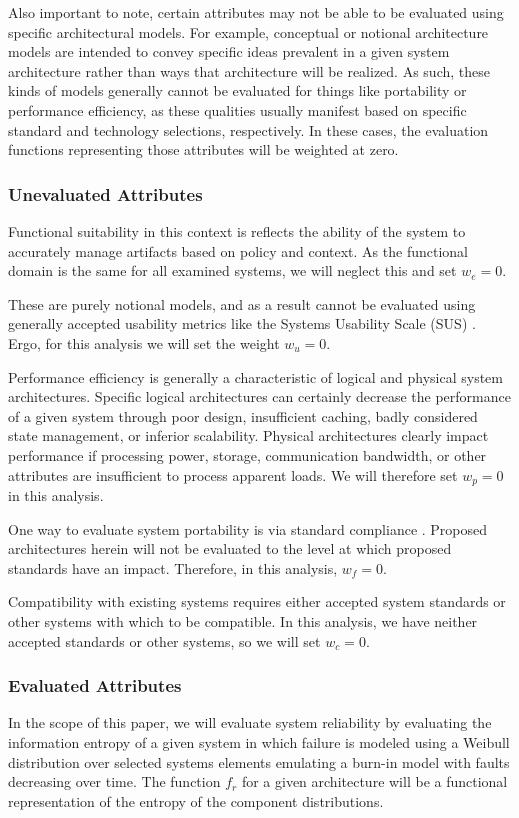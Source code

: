 Also important to note, certain attributes may not be able to be evaluated using specific architectural models.  For example, conceptual or notional architecture models are intended to convey specific ideas prevalent in a given system architecture rather than ways that architecture will be realized.  As such, these kinds of models generally cannot be evaluated for things like portability or performance efficiency, as these qualities usually manifest based on specific standard and technology selections, respectively.  In these cases, the evaluation functions representing those attributes will be weighted at zero.

\subsubsection*{Unevaluated Attributes}
Functional suitability in this context is reflects the ability of the system to accurately manage artifacts based on policy and context.  As the functional domain is the same for all examined systems, we will neglect this and set $ w_{e} = 0 $.

These are purely notional models, and as a result cannot be evaluated using generally accepted usability metrics like the Systems Usability Scale (SUS) \cite{proposal:sus}.  Ergo, for this analysis we will set the weight $w_{u} = 0$.

Performance efficiency is generally a characteristic of logical and physical system architectures.  Specific logical architectures can certainly decrease the performance of a given system through poor design, insufficient caching, badly considered state management, or inferior scalability.  Physical architectures clearly impact performance if processing power, storage, communication bandwidth, or other attributes are insufficient to process apparent loads.  We will therefore set $w_{p} = 0$ in this analysis.

One way to evaluate system portability is via standard compliance \cite{5958158}.  Proposed architectures herein will not be evaluated to the level at which proposed standards have an impact.  Therefore, in this analysis, $ w_{f} =0 $.

Compatibility with existing systems requires either accepted system standards or other systems with which to be compatible.  In this analysis, we have neither accepted standards or other systems, so we will set $ w_{c} = 0 $.

\subsubsection*{Evaluated Attributes}
In the scope of this paper, we will evaluate system reliability by evaluating the information entropy of a given system in which failure is modeled using a Weibull distribution over selected systems elements emulating a burn-in model with faults decreasing over time\cite{5754490}.  The function $ f_{r} $ for a given architecture will be a functional representation of the entropy of the component distributions.

